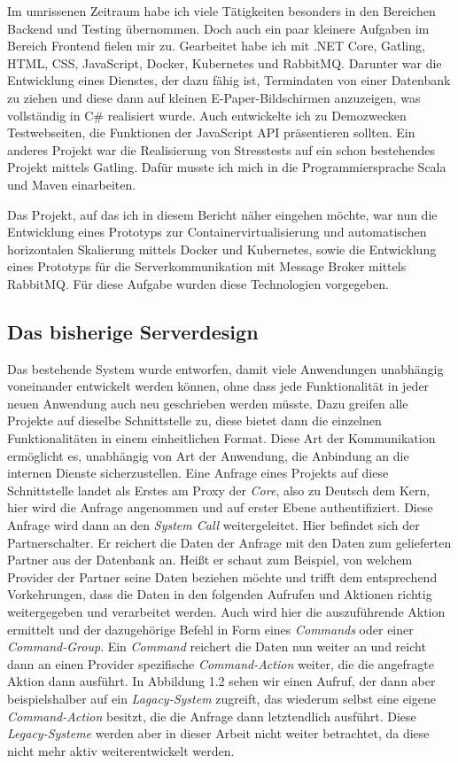 \documentclass[12pt,a4paper]{scrartcl}
\begin{document}
Im umrissenen Zeitraum habe ich viele Tätigkeiten besonders in den Bereichen Backend und Testing übernommen. Doch auch ein paar kleinere Aufgaben im Bereich Frontend fielen mir zu. Gearbeitet habe ich mit .NET Core, Gatling, HTML, CSS, JavaScript, Docker, Kubernetes und RabbitMQ. 
Darunter war die Entwicklung eines Dienstes, der dazu fähig ist, Termindaten von einer Datenbank zu ziehen und diese dann auf kleinen E-Paper-Bildschirmen anzuzeigen, was vollständig in C\# realisiert wurde. Auch entwickelte ich zu Demozwecken Testwebseiten, die Funktionen der JavaScript API präsentieren sollten. Ein anderes Projekt war die Realisierung von Stresstests auf ein schon bestehendes Projekt mittels Gatling. Dafür musste ich mich in die Programmiersprache Scala und Maven einarbeiten. 

Das Projekt, auf das ich in diesem Bericht näher eingehen möchte, war nun die Entwicklung eines Prototyps zur Containervirtualisierung und automatischen horizontalen Skalierung mittels Docker und Kubernetes, sowie die Entwicklung eines Prototyps für die Serverkommunikation mit Message Broker mittels RabbitMQ. Für diese Aufgabe wurden diese Technologien vorgegeben. 

\subsection{Das bisherige Serverdesign}
Das bestehende System wurde entworfen, damit viele Anwendungen unabhängig voneinander entwickelt werden können, ohne dass jede Funktionalität in jeder neuen Anwendung auch neu geschrieben werden müsste. Dazu greifen alle Projekte auf dieselbe Schnittstelle zu, diese bietet dann die einzelnen Funktionalitäten in einem einheitlichen Format. Diese Art der Kommunikation ermöglicht es, unabhängig von Art der Anwendung, die Anbindung an die internen Dienste sicherzustellen. 
Eine Anfrage eines Projekts auf diese Schnittstelle landet als Erstes am Proxy der \emph{Core}, also zu Deutsch dem Kern, hier wird die Anfrage angenommen und auf erster Ebene authentifiziert. Diese Anfrage wird dann an den \emph{System Call} weitergeleitet. Hier befindet sich der Partnerschalter. Er reichert die Daten der Anfrage mit den Daten zum gelieferten Partner aus der Datenbank an. Heißt er schaut zum Beispiel, von welchem Provider der Partner seine Daten beziehen möchte und trifft dem entsprechend Vorkehrungen, dass die Daten in den folgenden Aufrufen und Aktionen richtig weitergegeben und verarbeitet werden. Auch wird hier die auszuführende Aktion ermittelt und der dazugehörige Befehl in Form eines \emph{Commands} oder einer \emph{Command-Group}. 
Ein \emph{Command} reichert die Daten nun weiter an und reicht dann an einen Provider spezifische \emph{Command-Action} weiter, die die angefragte Aktion dann ausführt. In Abbildung 1.2 sehen wir einen Aufruf, der dann aber beispielshalber auf ein \emph{Lagacy-System} zugreift, das wiederum selbst eine eigene \emph{Command-Action} besitzt, die die Anfrage dann letztendlich ausführt. Diese \emph{\Gls{Legacy-System}e} werden aber in dieser Arbeit nicht weiter betrachtet, da diese nicht mehr aktiv weiterentwickelt werden.
\end{document}
